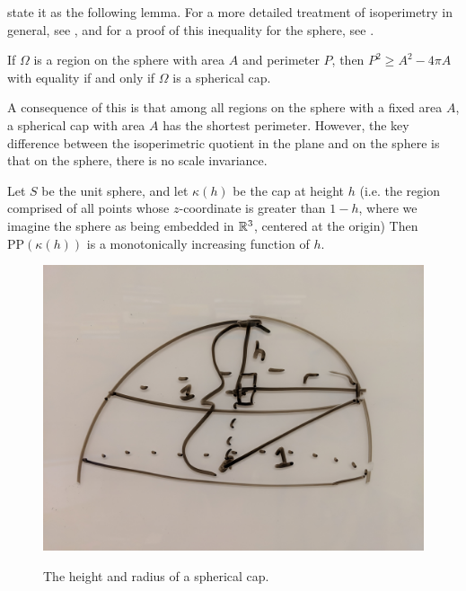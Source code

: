 state it as the following lemma.  For a more detailed treatment of
isoperimetry in general, see \cite{osserman1979bonnesen}, and for
a proof of this inequality for the sphere, see \cite{rado}.
\begin{lemma}
  If $\Omega$ is a region on the  sphere with area
  $A$ and perimeter $P$, then $P^2\geq A^2-4\pi A$ with equality if
  and only if $\Omega$ is a spherical cap.
\end{lemma}
A consequence of this is that among all regions on the sphere with
a fixed area $A$, a spherical cap with area $A$ has the shortest
perimeter. However, the key difference between the isoperimetric 
quotient in the plane and on the sphere is that on the 
sphere, there is no scale invariance.

\begin{lemma}\label{lem:ppscale}
  Let $S$ be the unit sphere, and let $\kappa(h)$ be the cap at height
  $h$ (i.e. the region comprised of all points whose $z$-coordinate is
  greater than $1-h$, where we imagine the sphere as being embedded in
  $\mathbb{R}^3$, centered at the origin) Then $\mathrm{PP}(\kappa(h))$ is
  a monotonically increasing function of $h$.
\end{lemma}
\begin{figure}
  \centering
  \includegraphics[width=.5\textwidth]{figs/spherical_cap.jpg}\\[1.5em]
  \caption{ The height and radius of a spherical cap. }
  \label{fig:caphr}
\end{figure}

